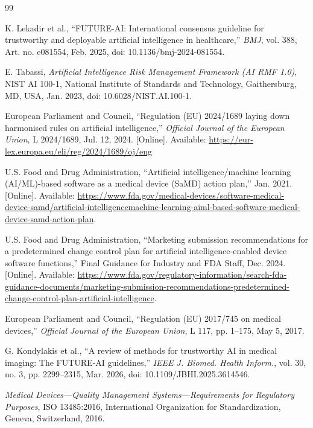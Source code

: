 \documentclass[journal,twoside,web]{ieeecolor}
\begin{document}
\begin{thebibliography}{99}
\sloppy

K. Lekadir et al.,
``FUTURE-AI: International consensus guideline for trustworthy and deployable artificial intelligence in healthcare,''
\textit{BMJ}, vol. 388, Art. no. e081554, Feb. 2025, doi: 10.1136/bmj-2024-081554.

E. Tabassi,
\textit{Artificial Intelligence Risk Management Framework (AI RMF 1.0)}, NIST AI 100-1,
National Institute of Standards and Technology, Gaithersburg, MD, USA, Jan. 2023,
doi: 10.6028/NIST.AI.100-1.

European Parliament and Council,
``Regulation (EU) 2024/1689 laying down harmonised rules on artificial intelligence,''
\textit{Official Journal of the European Union}, L 2024/1689, Jul. 12, 2024.
[Online]. Available: \url{https://eur-lex.europa.eu/eli/reg/2024/1689/oj/eng}

U.S. Food and Drug Administration,
``Artificial intelligence/machine learning (AI/ML)-based software as a medical device (SaMD) action plan,'' Jan. 2021.
[Online]. Available: \url{https://www.fda.gov/medical-devices/software-medical-device-samd/artificial-intelligencemachine-learning-aiml-based-software-medical-device-samd-action-plan}.

U.S. Food and Drug Administration,
``Marketing submission recommendations for a predetermined change control plan for artificial intelligence-enabled device software functions,''
Final Guidance for Industry and FDA Staff, Dec. 2024.
[Online]. Available: \url{https://www.fda.gov/regulatory-information/search-fda-guidance-documents/marketing-submission-recommendations-predetermined-change-control-plan-artificial-intelligence}.

European Parliament and Council,
``Regulation (EU) 2017/745 on medical devices,''
\textit{Official Journal of the European Union}, L 117, pp. 1--175, May 5, 2017.

G. Kondylakis et al.,
``A review of methods for trustworthy AI in medical imaging: The FUTURE-AI guidelines,''
\textit{IEEE J. Biomed. Health Inform.}, vol. 30, no. 3, pp. 2299--2315, Mar. 2026,
doi: 10.1109/JBHI.2025.3614546.

\textit{Medical Devices---Quality Management Systems---Requirements for Regulatory Purposes},
ISO 13485:2016, International Organization for Standardization, Geneva, Switzerland, 2016.


\end{thebibliography}
\end{document}
